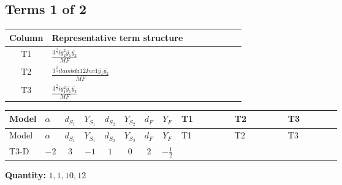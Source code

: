 \documentclass[8pt]{article}
\begin{document}
\begin{landscape}
\subsection*{Terms 1 of 2}
\begin{center}
\begin{tabular}{@{}c >{\raggedright\arraybackslash}p{0.82\linewidth}@{}}
\toprule
Column & Representative term structure \\
\midrule
T1 & \(\displaystyle \frac{3^{\frac{3}{4}} i g_{2}^{2} \overline{y_{1}} \overline{y_{2}}}{MF}\) \\
\midrule
T2 & \(\displaystyle \frac{3^{\frac{3}{4}} i lambda12Inv1 \overline{y_{1}} \overline{y_{2}}}{MF}\) \\
\midrule
T3 & \(\displaystyle \frac{3^{\frac{3}{4}} i g_{1}^{2} \overline{y_{1}} \overline{y_{2}}}{MF}\) \\
\midrule
\bottomrule
\end{tabular}
\end{center}
\smallskip
\tiny
\begin{longtable}{@{}llcccccc >{\raggedright\arraybackslash}p{0.21\linewidth} >{\raggedright\arraybackslash}p{0.21\linewidth} >{\raggedright\arraybackslash}p{0.21\linewidth}@{}}
\toprule
Model & $\alpha$ & $d_{S_1}$ & $Y_{S_1}$ & $d_{S_2}$ & $Y_{S_2}$ & $d_F$ & $Y_F$ & T1 & T2 & T3 \\
\midrule
\endfirsthead
\toprule
Model & $\alpha$ & $d_{S_1}$ & $Y_{S_1}$ & $d_{S_2}$ & $Y_{S_2}$ & $d_F$ & $Y_F$ & T1 & T2 & T3 \\
\midrule
\endhead
T3-D & $-2$ & $3$ & $-1$ & $1$ & $0$ & $2$ & $-\frac{1}{2}$ & \scriptsize\adjustbox{max width=\linewidth}{$\begin{gathered} - \frac{11 \cdot 3^{\frac{3}{4}} i g_{2}^{2} \overline{y_{1}} \overline{y_{2}}}{8 MF}\end{gathered}$} & \scriptsize\adjustbox{max width=\linewidth}{$\begin{gathered} - \frac{3^{\frac{3}{4}} i lambda12Inv1 \overline{y_{1}} \overline{y_{2}}}{6 MF}\end{gathered}$} & \scriptsize\adjustbox{max width=\linewidth}{$\begin{gathered} - \frac{3^{\frac{3}{4}} i g_{1}^{2} \overline{y_{1}} \overline{y_{2}}}{8 MF}\end{gathered}$} \\
\midrule
\bottomrule
\end{longtable}
\clearpage
\noindent\textbf{Quantity: }$\mathrm{1,1,10,12}$\par\smallskip

\end{landscape}
\end{document}
